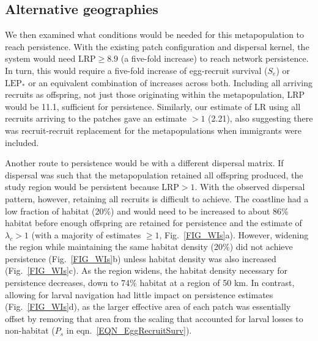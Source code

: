 \documentclass[12pt, oneside]{article}   	%
\begin{document}

\subsection*{Alternative geographies}

We then examined what conditions would be needed for this metapopulation to reach persistence. With the existing patch configuration and dispersal kernel, the system would need $\text{LRP} \geq 8.9$ (a five-fold increase) to reach network persistence. In turn, this would require a five-fold increase of egg-recruit survival ($S_e$) or $\text{LEP}_*$ or an equivalent combination of increases across both. Including all arriving recruits as offspring, not just those originating within the metapopulation, LRP would be 11.1, sufficient for persistence. Similarly, our estimate of LR using all recruits arriving to the patches gave an estimate $> 1$ (2.21), also suggesting there was recruit-recruit replacement for the metapopulations when immigrants were included. 

Another route to persistence would be with a different dispersal matrix. If dispersal was such that the metapopulation retained all offspring produced, the study region would be persistent because $\text{LRP} > 1$. With the observed dispersal pattern, however, retaining all recruits is difficult to achieve. The coastline had a low fraction of habitat (20\%) and would need to be increased to about 86\% habitat before enough offspring are retained for persistence and the estimate of $\lambda_c > 1$ (with a majority of estimates $\geq 1$, Fig.\ \ref{FIG_WIs}a). However, widening the region while maintaining the same habitat density (20\%) did not achieve persistence (Fig.\ \ref{FIG_WIs}b) unless habitat density was also increased (Fig.\ \ref{FIG_WIs}c). As the region widens, the habitat density necessary for persistence decreases, down to 74\% habitat at a region of 50 km. In contrast, allowing for larval navigation had little impact on persistence estimates (Fig.\ \ref{FIG_WIs}d), as the larger effective area of each patch was essentially offset by removing that area from the scaling that accounted for larval losses to non-habitat ($P_s$ in eqn.\ \ref{EQN_EggRecruitSurv}).
\end{document}
